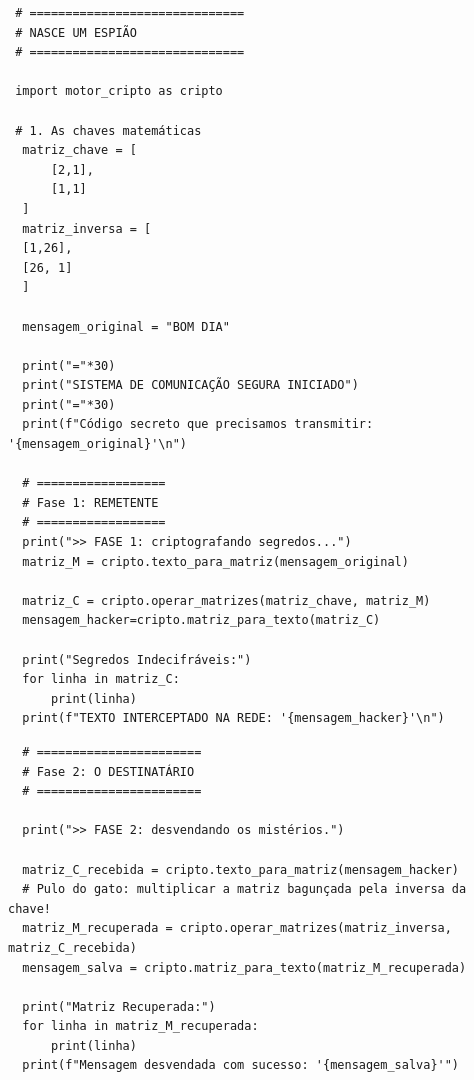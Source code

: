 \documentclass[../numerical_methods.tex]{subfiles}
\begin{document}
\begin{listing}[H]
	\begin{verbatim}
 # ============================== 
 # NASCE UM ESPIÃO
 # ============================== 

 import motor_cripto as cripto

 # 1. As chaves matemáticas 
  matriz_chave = [
      [2,1],
      [1,1]
  ]
  matriz_inversa = [
  [1,26],
  [26, 1]
  ]

  mensagem_original = "BOM DIA"

  print("="*30)
  print("SISTEMA DE COMUNICAÇÃO SEGURA INICIADO")
  print("="*30)
  print(f"Código secreto que precisamos transmitir: '{mensagem_original}'\n")

  # ==================
  # Fase 1: REMETENTE
  # ==================
  print(">> FASE 1: criptografando segredos...")
  matriz_M = cripto.texto_para_matriz(mensagem_original)

  matriz_C = cripto.operar_matrizes(matriz_chave, matriz_M)
  mensagem_hacker=cripto.matriz_para_texto(matriz_C)

  print("Segredos Indecifráveis:")
  for linha in matriz_C: 
      print(linha)
  print(f"TEXTO INTERCEPTADO NA REDE: '{mensagem_hacker}'\n")
\end{verbatim}
\end{listing}


\begin{verbatim}
  # =======================
  # Fase 2: O DESTINATÁRIO 
  # =======================

  print(">> FASE 2: desvendando os mistérios.")

  matriz_C_recebida = cripto.texto_para_matriz(mensagem_hacker)
  # Pulo do gato: multiplicar a matriz bagunçada pela inversa da chave!
  matriz_M_recuperada = cripto.operar_matrizes(matriz_inversa, matriz_C_recebida)
  mensagem_salva = cripto.matriz_para_texto(matriz_M_recuperada)

  print("Matriz Recuperada:")
  for linha in matriz_M_recuperada:
      print(linha)
  print(f"Mensagem desvendada com sucesso: '{mensagem_salva}'")
 \end{verbatim}
\end{document}
